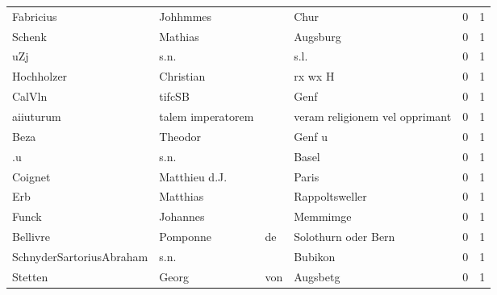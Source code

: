 \begin{center}
\begin{tiny}
\begin{longtabu}{llllrr}
                Fabricius &                           Johhmmes &             &                                        Chur &          0 &         1 \\
                   Schenk &                            Mathias &             &                                    Augsburg &          0 &         1 \\
                      uZj &                               s.n. &             &                                        s.l. &          0 &         1 \\
               Hochholzer &                          Christian &             &                                     rx wx H &          0 &         1 \\
                   CalVln &                             tifcSB &             &                                        Genf &          0 &         1 \\
                aiiuturum &                  talem imperatorem &             &              veram religionem vel opprimant &          0 &         1 \\
                     Beza &                            Theodor &             &                                      Genf u &          0 &         1 \\
                       .u &                               s.n. &             &                                       Basel &          0 &         1 \\
                  Coignet &                      Matthieu d.J. &             &                                       Paris &          0 &         1 \\
                      Erb &                           Matthias &             &                              Rappoltsweller &          0 &         1 \\
                    Funck &                           Johannes &             &                                    Memmimge &          0 &         1 \\
                 Bellivre &                           Pomponne &          de &                         Solothurn oder Bern &          0 &         1 \\
 SchnyderSartoriusAbraham &                               s.n. &             &                                     Bubikon &          0 &         1 \\
                  Stetten &                              Georg &         von &                                    Augsbetg &          0 &         1 \\

\end{longtabu}
\end{tiny}
\end{center}
